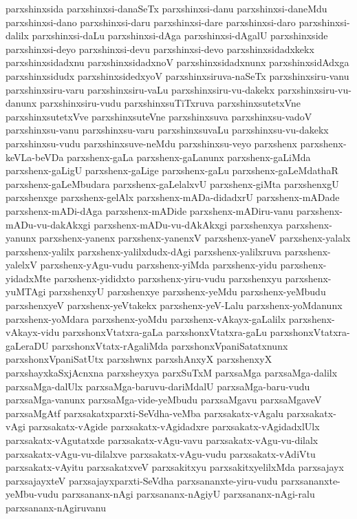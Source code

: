{parxshinxsida
parxshinxsi-danaSeTx
parxshinxsi-danu
parxshinxsi-daneMdu
parxshinxsi-dano
parxshinxsi-daru
parxshinxsi-dare
parxshinxsi-daro
parxshinxsi-dalilx
parxshinxsi-daLu
parxshinxsi-dAga
parxshinxsi-dAgalU
parxshinxside
parxshinxsi-deyo
parxshinxsi-devu
parxshinxsi-devo
parxshinxsidadxkekx
parxshinxsidadxnu
parxshinxsidadxnoV
parxshinxsidadxnunx
parxshinxsidAdxga
parxshinxsidudx
parxshinxsidedxyoV
parxshinxsiruva-naSeTx
parxshinxsiru-vanu
parxshinxsiru-varu
parxshinxsiru-vaLu
parxshinxsiru-vu-dakekx
parxshinxsiru-vu-danunx
parxshinxsiru-vudu
parxshinxsuTiTxruva
parxshinxsutetxVne
parxshinxsutetxVve
parxshinxsuteVne
parxshinxsuva
parxshinxsu-vadoV
parxshinxsu-vanu
parxshinxsu-varu
parxshinxsuvaLu
parxshinxsu-vu-dakekx
parxshinxsu-vudu
parxshinxsuve-neMdu
parxshinxsu-veyo
parxshenx
parxshenx-keVLa-beVDa
parxshenx-gaLa
parxshenx-gaLanunx
parxshenx-gaLiMda
parxshenx-gaLigU
parxshenx-gaLige
parxshenx-gaLu
parxshenx-gaLeMdathaR
parxshenx-gaLeMbudara
parxshenx-gaLelalxvU
parxshenx-giMta
parxshenxgU
parxshenxge
parxshenx-gelAlx
parxshenx-mADa-didadxrU
parxshenx-mADade
parxshenx-mADi-dAga
parxshenx-mADide
parxshenx-mADiru-vanu
parxshenx-mADu-vu-dakAkxgi
parxshenx-mADu-vu-dAkAkxgi
parxshenxya
parxshenx-yanunx
parxshenx-yanenx
parxshenx-yanenxV
parxshenx-yaneV
parxshenx-yalalx
parxshenx-yalilx
parxshenx-yalilxdudx-dAgi
parxshenx-yalilxruva
parxshenx-yalelxV
parxshenx-yAgu-vudu
parxshenx-yiMda
parxshenx-yidu
parxshenx-yidadxMte
parxshenx-yididxto
parxshenx-yiru-vudu
parxshenxyu
parxshenx-yuMTAgi
parxshenxyU
parxshenxye
parxshenx-yeMdu
parxshenx-yeMbudu
parxshenxyeV
parxshenx-yeVtakekx
parxshenx-yeV-Lalu
parxshenx-yoMdanunx
parxshenx-yoMdara
parxshenx-yoMdu
parxshenx-vAkayx-gaLalilx
parxshenx-vAkayx-vidu
parxshonxVtatxra-gaLa
parxshonxVtatxra-gaLu
parxshonxVtatxra-gaLeraDU
parxshonxVtatx-rAgaliMda
parxshonxVpaniSatatxnunx
parxshonxVpaniSatUtx
parxshwnx
parxshAnxyX
parxshenxyX
parxshayxkaSxjAcnxna
parxsheyxya
parxSuTxM
parxsaMga
parxsaMga-dalilx
parxsaMga-dalUlx
parxsaMga-baruvu-dariMdalU
parxsaMga-baru-vudu
parxsaMga-vanunx
parxsaMga-vide-yeMbudu
parxsaMgavu
parxsaMgaveV
parxsaMgAtf
parxsakatxparxti-SeVdha-veMba
parxsakatx-vAgalu
parxsakatx-vAgi
parxsakatx-vAgide
parxsakatx-vAgidadxre
parxsakatx-vAgidadxlUlx
parxsakatx-vAgutatxde
parxsakatx-vAgu-vavu
parxsakatx-vAgu-vu-dilalx
parxsakatx-vAgu-vu-dilalxve
parxsakatx-vAgu-vudu
parxsakatx-vAdiVtu
parxsakatx-vAyitu
parxsakatxveV
parxsakitxyu
parxsakitxyelilxMda
parxsajayx
parxsajayxteV
parxsajayxparxti-SeVdha
parxsananxte-yiru-vudu
parxsananxte-yeMbu-vudu
parxsananx-nAgi
parxsananx-nAgiyU
parxsananx-nAgi-ralu
parxsananx-nAgiruvanu
}
